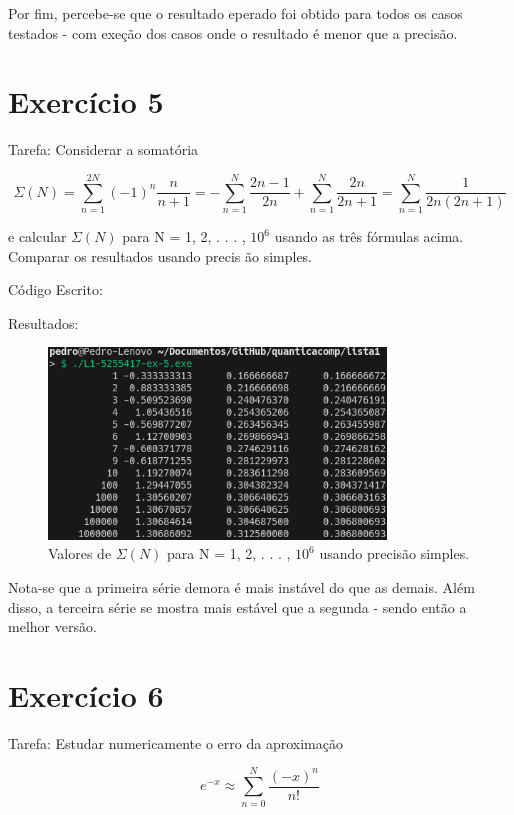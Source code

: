 \documentclass[12pt, a4paper]{article} %
\begin{document}
Por fim, percebe-se que o resultado eperado foi obtido para todos os casos testados - com exe\c{c}\~ao dos casos onde o resultado \'e menor que a precis\~ao.

\section{Exerc\'icio 5}

Tarefa: Considerar a somat\'oria

\begin{equation} \Sigma (N) = \sum_{n=1}^{2N} (-1)^n\frac{n}{n+1} = - \sum_{n=1}^N \frac{2n-1}{2n} + \sum_{n=1}^N \frac{2n}{2n+1} = \sum_{n=1}^N \frac{1}{2n(2n+1)} \end{equation}

e calcular $\Sigma (N)$ para N = 1, 2, . . . , $10^6$ usando as tr\^es f\'ormulas acima. Comparar os resultados usando precis \~ao simples.

C\'odigo Escrito:


Resultados:
\begin{figure}[H]
    \centering
    \includegraphics[width=0.8\textwidth]{../images/results-ex5.png}
    \caption{Valores de $\Sigma (N)$ para N = 1, 2, . . . , $10^6$ usando precis\~ao simples.}
\end{figure}

Nota-se que a primeira s\'erie demora \'e mais inst\'avel do que as demais. Al\'em disso, a terceira s\'erie se mostra mais est\'avel que a segunda - sendo ent\~ao a melhor vers\~ao.

\section{Exerc\'icio 6}

Tarefa: Estudar numericamente o erro da aproxima\c{c}\~ao

\begin{equation} e^{-x} \approx \sum_{n=0}^N \frac{(-x)^n}{n!} \end{equation}
\end{document}
